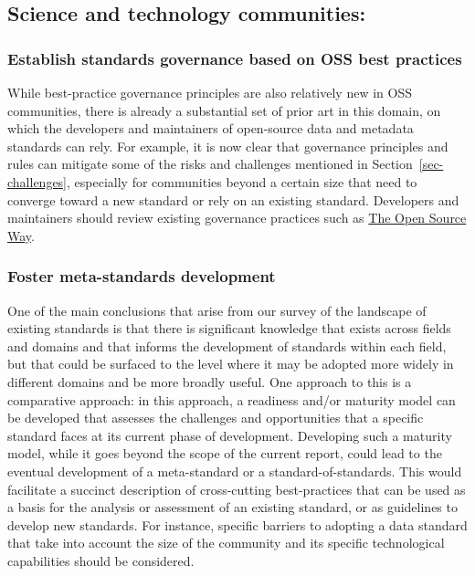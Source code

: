 \documentclass[
  letterpaper,
  DIV=11,
  numbers=noendperiod]{scrartcl}
\begin{document}
\subsection{Science and technology
communities:}\label{science-and-technology-communities}

\subsubsection{Establish standards governance based on OSS best
practices}\label{establish-standards-governance-based-on-oss-best-practices}

While best-practice governance principles are also relatively new in OSS
communities, there is already a substantial set of prior art in this
domain, on which the developers and maintainers of open-source data and
metadata standards can rely. For example, it is now clear that
governance principles and rules can mitigate some of the risks and
challenges mentioned in Section~\ref{sec-challenges}, especially for
communities beyond a certain size that need to converge toward a new
standard or rely on an existing standard. Developers and maintainers
should review existing governance practices such as
\href{https://www.theopensourceway.org/the_open_source_way-guidebook-2.0.html\#_project_and_community_governance}{The
Open Source Way}.

\subsubsection{Foster meta-standards
development}\label{foster-meta-standards-development}

One of the main conclusions that arise from our survey of the landscape
of existing standards is that there is significant knowledge that exists
across fields and domains and that informs the development of standards
within each field, but that could be surfaced to the level where it may
be adopted more widely in different domains and be more broadly useful.
One approach to this is a comparative approach: in this approach, a
readiness and/or maturity model can be developed that assesses the
challenges and opportunities that a specific standard faces at its
current phase of development. Developing such a maturity model, while it
goes beyond the scope of the current report, could lead to the eventual
development of a meta-standard or a standard-of-standards. This would
facilitate a succinct description of cross-cutting best-practices that
can be used as a basis for the analysis or assessment of an existing
standard, or as guidelines to develop new standards. For instance,
specific barriers to adopting a data standard that take into account the
size of the community and its specific technological capabilities should
be considered.
\end{document}
